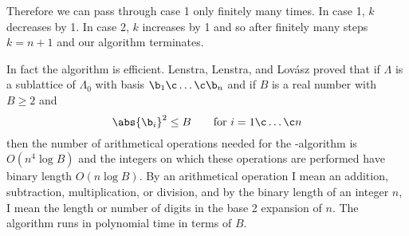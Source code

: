 Therefore we can pass through case 1 only finitely many times.  In case 1, $k$ decreases by 1.  In case 2, $k$ increases by 1 and so after finitely many steps $k=n+1$ and our algorithm terminates.

In fact the algorithm is efficient.  Lenstra, Lenstra, and Lov\'asz proved that if $\Lambda$ is a sublattice of $\Lambda_0$ with basis $\b_1\c \dotsc\c \b_n$ and if $B$ is a real number with $B\geq2$ and
\[ \abs{\b_i}^2 \leq B \qquad\text{for $i=1\c \dotsc\c n$} \]
then the number of arithmetical operations needed for the \LLL-algorithm is $O(n^4\log B)$ and the integers on which these operations are performed have binary length $O(n\log B)$.  By an arithmetical operation I mean an addition, subtraction, multiplication, or division, and by the binary length of an integer $n$, I mean the length or number of digits in the base 2 expansion of $n$.  The algorithm runs in polynomial time in terms of $B$.